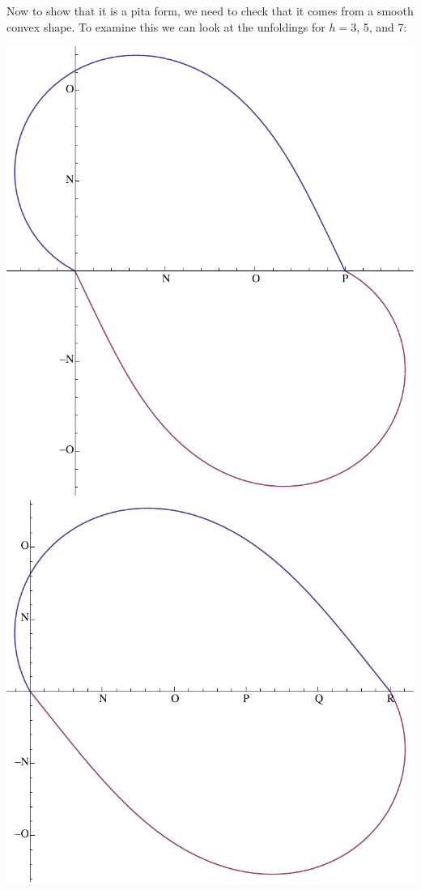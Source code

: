 \documentclass[12pt]{article}
\begin{document}
Now to show that it is a pita form, we need to check that it comes from a smooth convex shape. To examine this we can look at the unfoldings for $h=3$, 5, and 7:
\begin{center}
\includegraphics[scale=.4]{unfold_h=3.pdf}
\includegraphics[scale=.4]{unfold_h=5.pdf}

\end{center}
\end{document}
